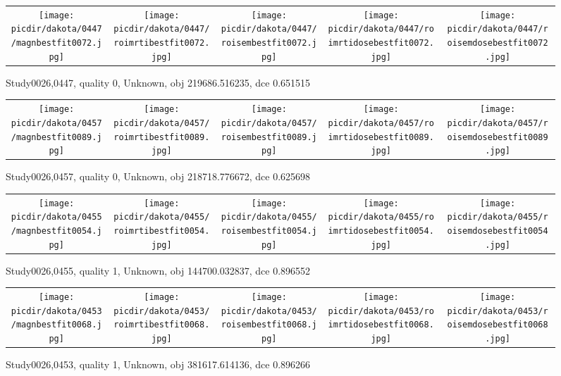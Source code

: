 \documentclass{article}
\newcommand{\picdir}{pdffig}
\begin{document}
\begin{figure} \begin{tabular}{ccccc} \scalebox{0.21}{\texttt{[image: \\picdir/dakota/0447/magnbestfit0072.jpg]}} & \scalebox{0.21}{\texttt{[image: \\picdir/dakota/0447/roimrtibestfit0072.jpg]}} & \scalebox{0.21}{\texttt{[image: \\picdir/dakota/0447/roisembestfit0072.jpg]}}  & \scalebox{0.21}{\texttt{[image: \\picdir/dakota/0447/roimrtidosebestfit0072.jpg]}} & \scalebox{0.21}{\texttt{[image: \\picdir/dakota/0447/roisemdosebestfit0072.jpg]}} \end{tabular} \caption{Study0026,0447, quality 0, Unknown, obj 219686.516235, dce 0.651515  } \label{Study00260447} \end{figure}
\clearpage
\begin{figure} \begin{tabular}{ccccc} \scalebox{0.21}{\texttt{[image: \\picdir/dakota/0457/magnbestfit0089.jpg]}} & \scalebox{0.21}{\texttt{[image: \\picdir/dakota/0457/roimrtibestfit0089.jpg]}} & \scalebox{0.21}{\texttt{[image: \\picdir/dakota/0457/roisembestfit0089.jpg]}}  & \scalebox{0.21}{\texttt{[image: \\picdir/dakota/0457/roimrtidosebestfit0089.jpg]}} & \scalebox{0.21}{\texttt{[image: \\picdir/dakota/0457/roisemdosebestfit0089.jpg]}} \end{tabular} \caption{Study0026,0457, quality 0, Unknown, obj 218718.776672, dce 0.625698  } \label{Study00260457} \end{figure}
\begin{figure} \begin{tabular}{ccccc} \scalebox{0.21}{\texttt{[image: \\picdir/dakota/0455/magnbestfit0054.jpg]}} & \scalebox{0.21}{\texttt{[image: \\picdir/dakota/0455/roimrtibestfit0054.jpg]}} & \scalebox{0.21}{\texttt{[image: \\picdir/dakota/0455/roisembestfit0054.jpg]}}  & \scalebox{0.21}{\texttt{[image: \\picdir/dakota/0455/roimrtidosebestfit0054.jpg]}} & \scalebox{0.21}{\texttt{[image: \\picdir/dakota/0455/roisemdosebestfit0054.jpg]}} \end{tabular} \caption{Study0026,0455, quality 1, Unknown, obj 144700.032837, dce 0.896552  } \label{Study00260455} \end{figure}
\begin{figure} \begin{tabular}{ccccc} \scalebox{0.21}{\texttt{[image: \\picdir/dakota/0453/magnbestfit0068.jpg]}} & \scalebox{0.21}{\texttt{[image: \\picdir/dakota/0453/roimrtibestfit0068.jpg]}} & \scalebox{0.21}{\texttt{[image: \\picdir/dakota/0453/roisembestfit0068.jpg]}}  & \scalebox{0.21}{\texttt{[image: \\picdir/dakota/0453/roimrtidosebestfit0068.jpg]}} & \scalebox{0.21}{\texttt{[image: \\picdir/dakota/0453/roisemdosebestfit0068.jpg]}} \end{tabular} \caption{Study0026,0453, quality 1, Unknown, obj 381617.614136, dce 0.896266  } \label{Study00260453} \end{figure}
\end{document}
